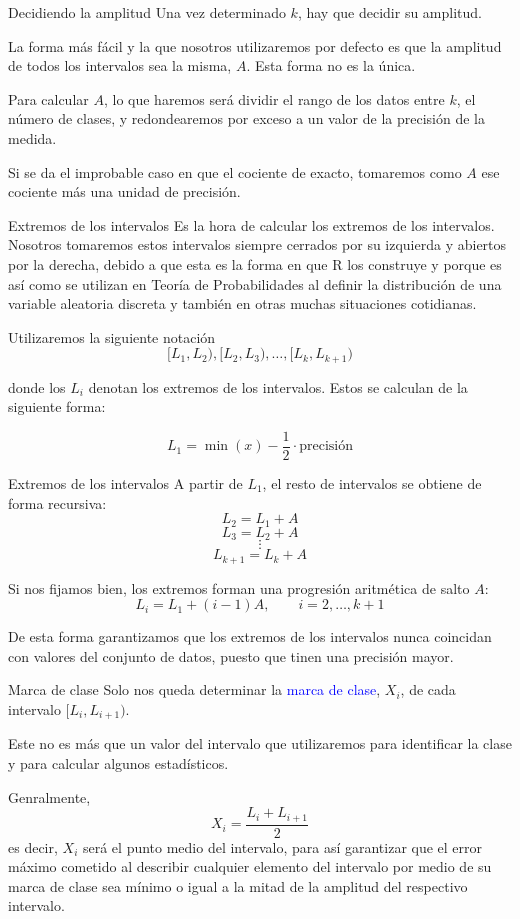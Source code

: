 \documentclass[
  ignorenonframetext,
]{beamer}
\newcommand\blue[1]{\textcolor{blue}{#1}}
\begin{document}
\begin{frame}{Decidiendo la amplitud}
\label{decidiendo-la-amplitud}
Una vez determinado \(k\), hay que decidir su amplitud.

La forma más fácil y la que nosotros utilizaremos por defecto es que la
amplitud de todos los intervalos sea la misma, \(A\). Esta forma no es
la única.

Para calcular \(A\), lo que haremos será dividir el rango de los datos
entre \(k\), el número de clases, y redondearemos por exceso a un valor
de la precisión de la medida.

Si se da el improbable caso en que el cociente de exacto, tomaremos como
\(A\) ese cociente más una unidad de precisión.
\end{frame}

\begin{frame}{Extremos de los intervalos}
\label{extremos-de-los-intervalos}
Es la hora de calcular los extremos de los intervalos. Nosotros
tomaremos estos intervalos siempre cerrados por su izquierda y abiertos
por la derecha, debido a que esta es la forma en que R los construye y
porque es así como se utilizan en Teoría de Probabilidades al definir la
distribución de una variable aleatoria discreta y también en otras
muchas situaciones cotidianas.

Utilizaremos la siguiente notación
\[[L_1,L_2),[L_2,L_3),\dots,[L_k,L_{k+1})\]

donde los \(L_i\) denotan los extremos de los intervalos. Estos se
calculan de la siguiente forma:

\[L_1 = \min(x)-\frac{1}{2}\cdot \text{precisión}\]
\end{frame}

\begin{frame}{Extremos de los intervalos}
\label{extremos-de-los-intervalos-1}
A partir de \(L_1\), el resto de intervalos se obtiene de forma
recursiva: \[L_2 = L_1 + A\] \[L_3 = L_2 + A\] \[\vdots\]
\[L_{k+1} = L_k+A\]

Si nos fijamos bien, los extremos forman una progresión aritmética de
salto \(A\): \[L_{i} = L_{1}+(i-1)A,\qquad i=2,\dots,k+1\]

De esta forma garantizamos que los extremos de los intervalos nunca
coincidan con valores del conjunto de datos, puesto que tinen una
precisión mayor.
\end{frame}

\begin{frame}{Marca de clase}
\label{marca-de-clase}
Solo nos queda determinar la \blue{marca de clase}, \(X_i\), de cada
intervalo \([L_i,L_{i+1})\).

Este no es más que un valor del intervalo que utilizaremos para
identificar la clase y para calcular algunos estadísticos.

Genralmente, \[X_i = \frac{L_i+L_{i+1}}{2}\] es decir, \(X_i\) será el
punto medio del intervalo, para así garantizar que el error máximo
cometido al describir cualquier elemento del intervalo por medio de su
marca de clase sea mínimo o igual a la mitad de la amplitud del
respectivo intervalo.
\end{frame}
\end{document}
